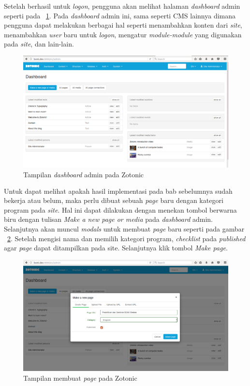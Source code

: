 Setelah berhasil untuk \textit{logon}, pengguna akan melihat halaman \textit{dashboard} admin seperti pada \pic~\ref{fig:dashboard}. Pada \textit{dashboard} admin ini, sama seperti CMS lainnya dimana pengguna dapat melakukan berbagai hal seperti menambahkan konten dari \textit{site}, menambahkan \textit{user} baru untuk \textit{logon}, mengatur \textit{module-module} yang digunakan pada \textit{site}, dan lain-lain.
\begin{figure}
	\centering
	\includegraphics[width=1\textwidth]
	{pics/3-adminDashboard.png}
	\caption{Tampilan \textit{dashboard} admin pada Zotonic}
	\label{fig:dashboard}
\end{figure}
\vspace{-0.3cm}

Untuk dapat melihat apakah hasil implementasi pada bab sebelumnya sudah bekerja atau belum, maka perlu dibuat sebuah \textit{page} baru dengan kategori program pada \textit{site}. Hal ini dapat dilakukan dengan menekan tombol berwarna biru dengan tulisan \textit{Make a new page or media} pada \textit{dashboard} admin. Selanjutnya akan muncul \textit{modals} untuk membuat \textit{page} baru seperti pada gambar \pic~\ref{fig:createprogram}. Setelah mengisi nama dan memilih kategori program, \textit{checklist} pada \textit{published} agar \textit{page} dapat ditampilkan pada site. Selanjutnya klik tombol \textit{Make page}.

\begin{figure}
	\centering
	\includegraphics[width=1\textwidth]
	{pics/3-createProgram.png}
	\caption{Tampilan membuat \textit{page} pada Zotonic}
	\label{fig:createprogram}
\end{figure}
\vspace{-0.3cm}

